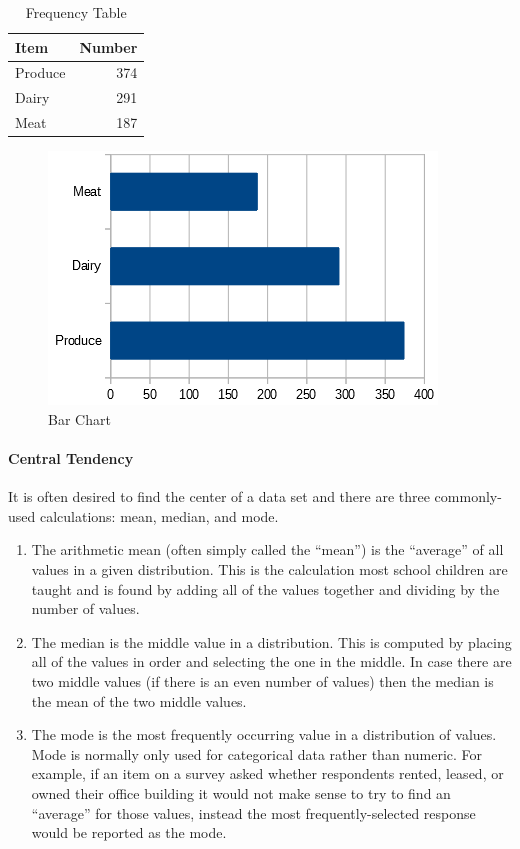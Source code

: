 \begin{table}[H]
	\centering
	\begin{tabulary}{\linewidth}{LR}
		\hline
		Item & Number \\ 
		\hline
		Produce & 374 \\ 
		Dairy & 291 \\ 
		Meat & 187 \\ 
		\hline
	\end{tabulary} 
	\caption{Frequency Table}
	\label{14:tab01}
\end{table}

\vspace{.15in}

\begin{figure}[H]
	\centering
	\includegraphics[width=\maxwidth{.95\linewidth}]{gfx/14-BarChart}
	\caption{Bar Chart}
	\label{14:fig01}
\end{figure}

\paragraph{Central Tendency} It is often desired to find the center of a data set and there are three commonly-used calculations: mean, median, and mode. 

\begin{enumerate}

	\item The arithmetic mean (often simply called the ``mean'') is the ``average'' of all values in a given distribution. This is the calculation most school children are taught and is found by adding all of the values together and dividing by the number of values.

	\item The median is the middle value in a distribution. This is computed by placing all of the values in order and selecting the one in the middle. In case there are two middle values (if there is an even number of values) then the median is the mean of the two middle values.
	
	\item The mode is the most frequently occurring value in a distribution of values. Mode is normally only used for categorical data rather than numeric. For example, if an item on a survey asked whether respondents rented, leased, or owned their office building it would not make sense to try to find an ``average'' for those values, instead the most frequently-selected response would be reported as the mode. 

\end{enumerate}

